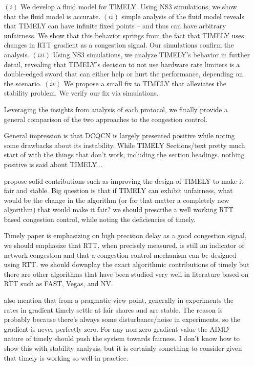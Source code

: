  $(i)$ We develop a fluid model for TIMELY. Using NS3 simulations,
we show that the fluid model is accurate. $(ii)$ simple analysis of the fluid model
reveals that TIMELY can have infinite fixed points -- and thus can have
arbitrary unfairness. We show that this behavior springs from the fact that
TIMELY uses changes in RTT gradient as a congestion signal.
Our simulations confirm the analysis. $(iii)$ Using NS3
simulations, we analyze TIMELY's behavior in further detail, revealing that
TIMELY's decision to not use hardware rate limiters is a double-edged sword that
can either help or hurt the performance, depending on the scenario. $(iv)$ We
propose a small fix to TIMELY that alleviates the stability problem. We verify
our fix via simulations.

Leveraging the insights from analysis of each protocol, we finally provide a
general comparison of the two approaches to the congestion control.


General impression is that DCQCN is largely presented positive while noting some drawbacks about its instability. While TIMELY Sections/text pretty much start of with the things that don't work, including the section headings. nothing positive is said about TIMELY...

propose solid contributions such as improving the design of TIMELY to make it fair and stable. Big question is that if TIMELY can exhibit unfairness, what would be the change in the algorithm (or for that matter a completely new algorithm) that would make it fair? we should prescribe a well working RTT based congestion control, while noting the deficiencies of timely.

Timely paper is emphasizing on high precision delay as a good congestion signal, we should emphasize that RTT, when precisely measured, is still an indicator of network congestion and that a congestion control mechanism can be designed using RTT. we should downplay the exact algorithmic contributions of timely but there are other algorithms that have been studied very well in literature based on RTT such as FAST, Vegas, and NV.

also mention that from a pragmatic view point, generally in experiments the rates in gradient timely settle at fair shares and are stable. The reason is probably because there's always some disturbance/noise in experiments, so the gradient is never perfectly zero. For any non-zero gradient value the AIMD nature of timely should push the system towards fairness. I don't know how to show this with stability analysis, but it is certainly something to consider given that timely is working so well in practice.


